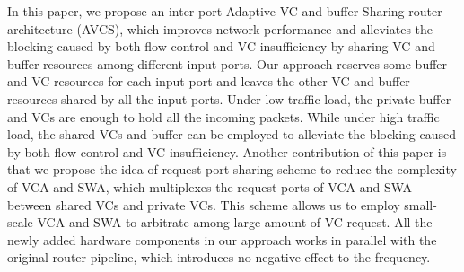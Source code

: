 \documentclass[10pt,conference]{IEEEtran}
\begin{document}

In this paper, we propose an inter-port Adaptive VC and buffer Sharing router architecture (AVCS), which improves network performance and alleviates the blocking caused by both flow control and VC insufficiency by sharing VC and buffer resources among different input ports. Our approach reserves some buffer and VC resources for each input port and leaves the other VC and buffer resources shared by all the input ports. Under low traffic load, the private buffer and VCs are enough to hold all the incoming packets. While under high traffic load, the shared VCs and buffer can be employed to alleviate the blocking caused by both flow control and VC insufficiency. Another contribution of this paper is that we propose the idea of request port sharing scheme to reduce the complexity of VCA and SWA, which multiplexes the request ports of VCA and SWA between shared VCs and private VCs. This scheme allows us to employ small-scale VCA and SWA to arbitrate among large amount of VC request. All the newly added hardware components in our approach works in parallel with the original router pipeline, which introduces no negative effect to the frequency.

\end{document}
